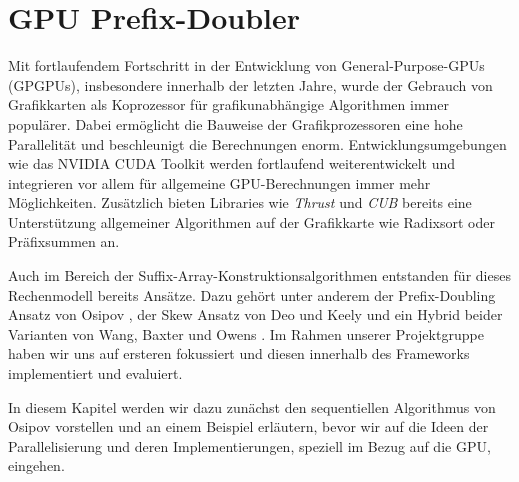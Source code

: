 \section{GPU Prefix-Doubler}
\label{algorithm:gpuprefix}

Mit fortlaufendem Fortschritt in der Entwicklung von General-Purpose-GPUs (GPGPUs), insbesondere innerhalb der letzten Jahre, wurde der Gebrauch von Grafikkarten als Koprozessor für grafikunabhängige Algorithmen immer populärer. Dabei ermöglicht die Bauweise der Grafikprozessoren eine hohe Parallelität und beschleunigt die Berechnungen enorm. Entwicklungsumgebungen wie das NVIDIA CUDA Toolkit werden fortlaufend weiterentwickelt und integrieren vor allem für allgemeine GPU-Berechnungen immer mehr Möglichkeiten. Zusätzlich bieten Libraries wie \textit{Thrust} und \textit{CUB} bereits eine Unterstützung allgemeiner Algorithmen auf der Grafikkarte wie Radixsort oder Präfixsummen an.

Auch im Bereich der Suffix-Array-Konstruktionsalgorithmen entstanden für dieses Rechenmodell bereits Ansätze. Dazu gehört unter anderem der Prefix-Doubling Ansatz von Osipov \cite{osipovGPU}, der Skew Ansatz von Deo und Keely \cite{deoGPU} und ein Hybrid beider Varianten von Wang, Baxter und Owens \cite{wangGPU}. Im Rahmen unserer Projektgruppe haben wir uns auf ersteren fokussiert und diesen innerhalb des Frameworks implementiert und evaluiert.

In diesem Kapitel werden wir dazu zunächst den sequentiellen Algorithmus von Osipov vorstellen und an einem Beispiel erläutern, bevor wir auf die Ideen der Parallelisierung und deren Implementierungen, speziell im Bezug auf die GPU, eingehen.

